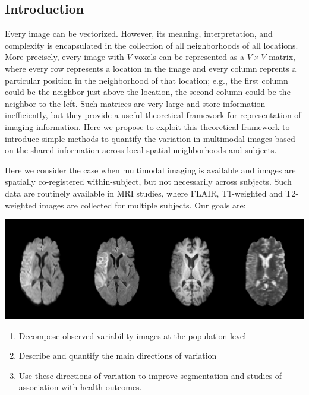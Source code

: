 \documentclass[a0,landscape]{a0poster}
\begin{document}
\begin{multicols}{3}
\color{black} %
\large{\section*{\color{uwred}Introduction}}
\hspace{1cm} Every image can be vectorized. However, its meaning, interpretation, and complexity is encapsulated in the collection of all neighborhoods of all locations. More precisely, every image with $V$ voxels can be represented as a $V\times V$ matrix, where every row represents a location in the image and every column reprents a particular position in the neighborhood of that location; e.g., the first column could be the neighbor just above the location, the second column could be the neighbor to the left. Such  matrices are very large and store information inefficiently, but they provide a useful theoretical framework for representation of imaging information. Here we propose to exploit this theoretical framework to introduce simple methods to quantify the variation in multimodal images based on the shared information across local spatial neighborhoods and subjects.

\hspace{1cm}Here we consider the case when multimodal imaging is available and images are spatially co-registered within-subject, but not necessarily across subjects.  Such data are routinely available in MRI studies, where FLAIR, T1-weighted and T2-weighted images are collected for multiple subjects. Our goals are:
\begin{center}\vspace{.75cm}
\includegraphics[width=1\linewidth]{image_ex.pdf}
\end{center}\vspace{.5cm}
\begin{enumerate}
\item  Decompose observed variability images at the population level
\item Describe and quantify the main directions of variation
\item Use these directions of variation to improve segmentation and studies of association with health outcomes.
\end{enumerate}



\end{multicols}
\end{document}
